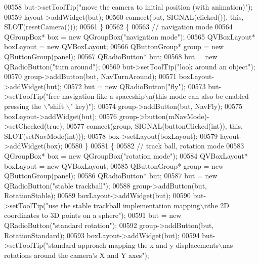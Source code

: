 \begin{DoxyCode}
00558     but->setToolTip(\textcolor{stringliteral}{"move the camera to initial position (with animation)"});
00559     layout->addWidget(but);
00560     connect(but, SIGNAL(clicked()), \textcolor{keyword}{this}, SLOT(resetCamera()));
00561   \}
00562   \{
00563     \textcolor{comment}{// navigation mode}
00564     QGroupBox* box = \textcolor{keyword}{new} QGroupBox(\textcolor{stringliteral}{"navigation mode"});
00565     QVBoxLayout* boxLayout = \textcolor{keyword}{new} QVBoxLayout;
00566     QButtonGroup* group = \textcolor{keyword}{new} QButtonGroup(panel);
00567     QRadioButton* but;
00568     but = \textcolor{keyword}{new} QRadioButton(\textcolor{stringliteral}{"turn around"});
00569     but->setToolTip(\textcolor{stringliteral}{"look around an object"});
00570     group->addButton(but, NavTurnAround);
00571     boxLayout->addWidget(but);
00572     but = \textcolor{keyword}{new} QRadioButton(\textcolor{stringliteral}{"fly"});
00573     but->setToolTip(\textcolor{stringliteral}{"free navigation like a spaceship\(\backslash\)n(this mode can also be enabled pressing the \(\backslash\)"shift
      \(\backslash\)" key)"});
00574     group->addButton(but, NavFly);
00575     boxLayout->addWidget(but);
00576     group->button(mNavMode)->setChecked(\textcolor{keyword}{true});
00577     connect(group, SIGNAL(buttonClicked(\textcolor{keywordtype}{int})), \textcolor{keyword}{this}, SLOT(setNavMode(\textcolor{keywordtype}{int})));
00578     box->setLayout(boxLayout);
00579     layout->addWidget(box);
00580   \}
00581   \{
00582     \textcolor{comment}{// track ball, rotation mode}
00583     QGroupBox* box = \textcolor{keyword}{new} QGroupBox(\textcolor{stringliteral}{"rotation mode"});
00584     QVBoxLayout* boxLayout = \textcolor{keyword}{new} QVBoxLayout;
00585     QButtonGroup* group = \textcolor{keyword}{new} QButtonGroup(panel);
00586     QRadioButton* but;
00587     but = \textcolor{keyword}{new} QRadioButton(\textcolor{stringliteral}{"stable trackball"});
00588     group->addButton(but, RotationStable);
00589     boxLayout->addWidget(but);
00590     but->setToolTip(\textcolor{stringliteral}{"use the stable trackball implementation mapping\(\backslash\)nthe 2D coordinates to 3D points on a
       sphere"});
00591     but = \textcolor{keyword}{new} QRadioButton(\textcolor{stringliteral}{"standard rotation"});
00592     group->addButton(but, RotationStandard);
00593     boxLayout->addWidget(but);
00594     but->setToolTip(\textcolor{stringliteral}{"standard approach mapping the x and y displacements\(\backslash\)nas rotations around the camera's
       X and Y axes"});

\end{DoxyCode}
